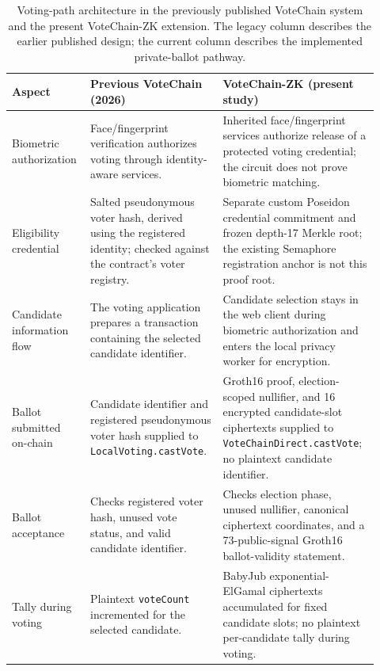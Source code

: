 \begin{table}[tbp]
\centering
\caption{Voting-path architecture in the previously published VoteChain
system and the present VoteChain-ZK extension. The legacy column describes
the earlier published design; the current column describes the implemented
private-ballot pathway.}
\label{tab:architecture-prior-comparison}
\footnotesize
\setlength{\tabcolsep}{4pt}
\renewcommand{\arraystretch}{1.12}
\begin{tabular}{@{}>{\raggedright\arraybackslash}p{0.18\linewidth}>{\raggedright\arraybackslash}p{0.34\linewidth}>{\raggedright\arraybackslash}p{0.40\linewidth}@{}}
\toprule
\textbf{Aspect} & \textbf{Previous VoteChain (2026)} & \textbf{VoteChain-ZK (present study)} \\
\midrule
Biometric authorization &
Face/fingerprint verification authorizes voting through identity-aware services. &
Inherited face/fingerprint services authorize release of a protected voting credential; the circuit does not prove biometric matching. \\
\addlinespace[3pt]
Eligibility credential &
Salted pseudonymous voter hash, derived using the registered identity; checked against the contract's voter registry. &
Separate custom Poseidon credential commitment and frozen depth-17 Merkle root; the existing Semaphore registration anchor is not this proof root. \\
\addlinespace[3pt]
Candidate information flow &
The voting application prepares a transaction containing the selected candidate identifier. &
Candidate selection stays in the web client during biometric authorization and enters the local privacy worker for encryption. \\
\addlinespace[3pt]
Ballot submitted on-chain &
Candidate identifier and registered pseudonymous voter hash supplied to \texttt{LocalVoting.castVote}. &
Groth16 proof, election-scoped nullifier, and 16 encrypted candidate-slot ciphertexts supplied to \texttt{VoteChainDirect.castVote}; no plaintext candidate identifier. \\
\addlinespace[3pt]
Ballot acceptance &
Checks registered voter hash, unused vote status, and valid candidate identifier. &
Checks election phase, unused nullifier, canonical ciphertext coordinates, and a 73-public-signal Groth16 ballot-validity statement. \\
\addlinespace[3pt]
Tally during voting &
Plaintext \texttt{voteCount} incremented for the selected candidate. &
BabyJub exponential-ElGamal ciphertexts accumulated for fixed candidate slots; no plaintext per-candidate tally during voting. \\

\end{tabular}
\end{table}

